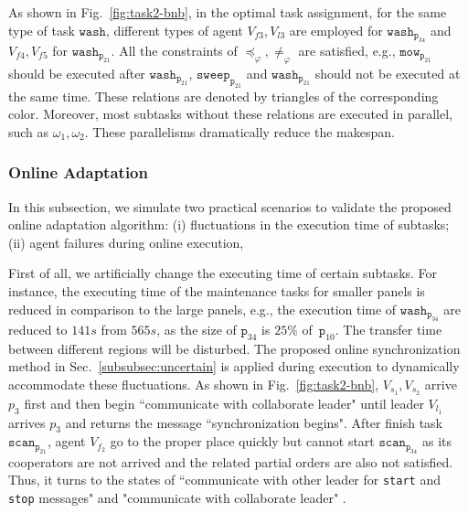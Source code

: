 As shown in Fig.~\ref{fig:task2-bnb},
in the optimal task assignment, for the same type of task $\texttt{wash}$,
different types of agent $V_{f3},V_{l3}$ are employed for $\texttt{wash}_{\texttt{p}_{34}}$ and
 $V_{f4},V_{f5}$ for $\texttt{wash}_{\texttt{p}_{21}}$. All the constraints
 of $\preceq_\varphi,\neq_\varphi$ are satisfied, e.g., $\texttt{mow}_{\texttt{p}_{21}}$
should be executed after $\texttt{wash}_{\texttt{p}_{21}}$,
$\texttt{sweep}_{\texttt{p}_{21}}$ and $\texttt{wash}_{\texttt{p}_{21}}$
should not be executed at the same time. These relations are denoted by triangles of the corresponding color.
Moreover, most subtasks without these relations are executed in parallel, such as $\omega_1,\omega_2$.
These parallelisms dramatically reduce the makespan.




\subsubsection{Online Adaptation}\label{subsubsec:exp-adapt}
In this subsection, we simulate
two practical scenarios to validate the proposed online adaptation algorithm:
(i) fluctuations in the execution time of subtasks;
(ii) agent failures during online execution,

First of all, we artificially change the executing time of certain subtasks.
For instance, the executing time of the maintenance tasks for smaller panels
is reduced in comparison to the large panels, e.g., the execution time
of $\texttt{wash}_{\texttt{p}_{34}}$ are reduced to $141s$ from $565s$, as the size
of $\texttt{p}_{34}$ is $25\%$ of~$\texttt{p}_{10}$. The transfer time
between different regions will be disturbed. The proposed online synchronization method in
 Sec.~\ref{subsubsec:uncertain} is applied during execution to dynamically accommodate these fluctuations.
 As shown in Fig.~\ref{fig:task2-bnb}, $V_{s_1}, V_{s_2}$ arrive $p_3$ first
and then begin ``communicate with collaborate leader" until leader $V_{l_1}$ arrives $p_3$ and returns the message ``synchronization begins". After finish task $\texttt{scan}_{\texttt{p}_{21}}$,
  agent $V_{f_2} $ go to the proper place quickly but cannot start $\texttt{scan}_{\texttt{p}_{34}}$ as its cooperators are not arrived
  and the related partial orders are also not satisfied.
  Thus, it turns to the states of ``communicate with other leader for \texttt{start} and \texttt{stop} messages" and "communicate with collaborate leader" .


